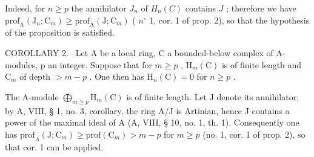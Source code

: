 Indeed, for \(n \geqslant p\) the annihilator \(J_n\) of \(H_n(C)\) contains \(J\) ; therefore we have \(\mathrm{prof}_{\mathrm{A}}(\mathrm{J}_{n};\mathrm{C}_{m}) \geqslant \mathrm{prof}_{\mathrm{A}}(\mathrm{J};\mathrm{C}_{m})\) ( \(n^{\circ}\) 1, cor. 1 of prop. 2), so that the hypothesis of the proposition is satisfied.

COROLLARY 2.-- Let A be a local ring, C a bounded-below complex of A-modules, p an integer. Suppose that for \(m \geqslant p\) , \(\mathrm{H}_{m}(\mathrm{C})\) is of finite length and \(\mathrm{C}_{m}\) of depth \(>m-p\) . One then has \(\mathrm{H}_{n}(\mathrm{C}) = 0\) for \(n \geqslant p\) .

The A-module \(\bigoplus_{m\geqslant p}\mathrm{H}_{m}(\mathrm{C})\) is of finite length. Let J denote its annihilator; by A, VIII, § 1, no. 3, corollary, the ring A/J is Artinian, hence J contains a power of the maximal ideal of A (A, VIII, § 10, no. 1, th. 1). Consequently one has \(\mathrm{prof}_A(\mathrm{J};\mathrm{C}_m)\geqslant \mathrm{prof}(\mathrm{C}_m) > m - p\) for \(m\geqslant p\) (no. 1, cor. 1 of prop. 2), so that cor. 1 can be applied.

